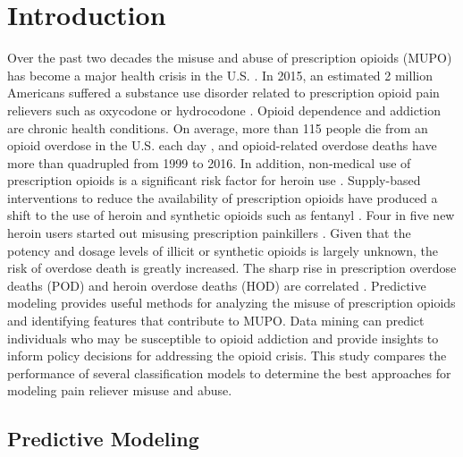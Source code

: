 \documentclass[sigconf]{acmart}
\begin{document}
\section{Introduction}

Over the past two decades the misuse and abuse of prescription opioids 
(MUPO) has become a major health crisis in the U.S. \cite{volkow14}. In 2015, 
an estimated 2 million Americans suffered a substance use disorder related 
to prescription opioid pain relievers such as oxycodone or hydrocodone 
\cite{nida18}. Opioid dependence and addiction are chronic health conditions. 
On average, more than 115 people die from an opioid overdose in the U.S. 
each day \cite{cdc18}, and opioid-related overdose deaths have more than 
quadrupled from 1999 to 2016. In addition, non-medical use of prescription 
opioids is a significant risk factor for heroin use \cite{Rudd16}. 
Supply-based interventions to reduce the availability of prescription opioids 
have produced a shift to the use of heroin and synthetic opioids such as 
fentanyl \cite{jones15}. Four in five new heroin users started out misusing 
prescription painkillers \cite{jones13}. Given that the potency and dosage 
levels of illicit or synthetic opioids is largely unknown, the risk of overdose
death is greatly increased. The sharp rise in prescription overdose deaths 
(POD) and heroin overdose deaths (HOD) are correlated \cite{muhuri13, unick13}. 
Predictive modeling provides useful methods for analyzing the misuse of 
prescription opioids and identifying features that contribute to MUPO. 
Data mining can predict individuals who may be susceptible to opioid addiction 
and provide insights to inform policy decisions for addressing the opioid 
crisis. This study compares the performance of several classification models 
to determine the best approaches for modeling pain reliever misuse and abuse. 


\subsection{Predictive Modeling}
\end{document}

